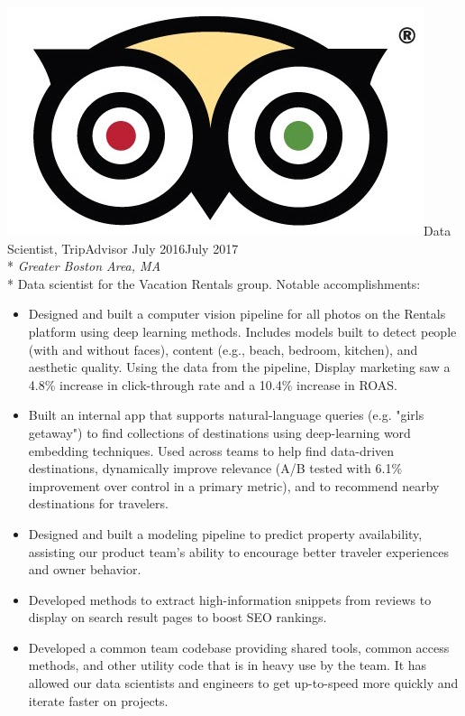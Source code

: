 \documentclass[print]{friggeri-cv} %
\newcommand{\tripicon}{\includegraphics[scale=0.05]{trip_logo.jpg}}%
\begin{document}
\begin{description} \itemsep1pt \parskip0pt 
  \item \tripicon {\largeheaderfont Data Scientist, TripAdvisor } \hfill
    {\smallheaderfont July 2016\textemdash July 2017}\\*
    {\footnotesize \emph{Greater Boston Area, MA}} \\*
    Data scientist for the Vacation Rentals group.
    {\smallheaderfont Notable accomplishments}:
    \begin{itemize} \itemsep1pt \parskip1pt 
      \item Designed and built a computer vision pipeline for all photos on the Rentals
        platform using deep learning methods. Includes models built to
        detect people (with and without faces), content (e.g., beach, bedroom,
        kitchen), and aesthetic quality. Using the
        data from the pipeline, Display marketing saw a 4.8\% increase in click-through
        rate and a 10.4\% increase in ROAS.
      \item Built an internal app that supports natural-language
        queries (e.g. "girls getaway") to find collections of destinations using
        deep-learning word embedding techniques. Used across teams 
        to help find data-driven destinations, dynamically improve relevance
        (A/B tested with 6.1\% improvement over control in a primary metric), 
        and to recommend nearby destinations for travelers.
      \item Designed and built a modeling pipeline to predict property availability,
        assisting our product team's ability to encourage better traveler experiences
        and owner behavior.
      \item Developed methods to extract high-information snippets from reviews to
        display on search result pages to boost SEO rankings.
      \item Developed a common team codebase providing shared tools, common access
        methods, and other utility code that is in heavy use by the team. It has
        allowed our data scientists and engineers to get up-to-speed more quickly and
        iterate faster on projects.
    \end{itemize}
  \end{description}
\end{document}
